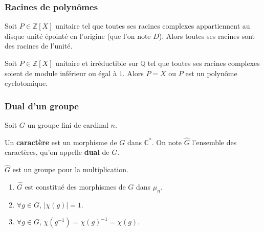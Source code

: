   \subsubsection{Racines de polynômes}


  \begin{theorem}
    Soit $P \in \mathbb{Z}[X]$ unitaire tel que toutes ses racines complexes appartiennent au disque unité épointé en l'origine (que l'on note $D$). Alors toutes ses racines sont des racines de l'unité.
  \end{theorem}

  \begin{corollary}
    Soit $P \in \mathbb{Z}[X]$ unitaire et irréductible sur $\mathbb{Q}$ tel que toutes ses racines complexes soient de module inférieur ou égal à $1$. Alors $P = X$ ou $P$ est un polynôme cyclotomique.
  \end{corollary}

  \subsubsection{Dual d'un groupe}

  Soit $G$ un groupe fini de cardinal $n$.


  \begin{definition}
    Un \textbf{caractère} est un morphisme de $G$ dans $\mathbb{C}^*$. On note $\widehat{G}$ l'ensemble des caractères, qu'on appelle \textbf{dual} de $G$.
  \end{definition}

  \begin{proposition}
    $\widehat{G}$ est un groupe pour la multiplication.
  \end{proposition}

  \begin{proposition}
    \begin{enumerate}[label={\bfseries(\roman*)}]
      \item $\widehat{G}$ est constitué des morphismes de $G$ dans $\mu_n$.
      \item $\forall g \in G$, $\vert \chi(g) \vert = 1$.
      \item $\forall g \in G$, $\chi(g^{-1}) = \chi(g)^{-1} = \overline{\chi(g)}$.
    \end{enumerate}
  \end{proposition}

